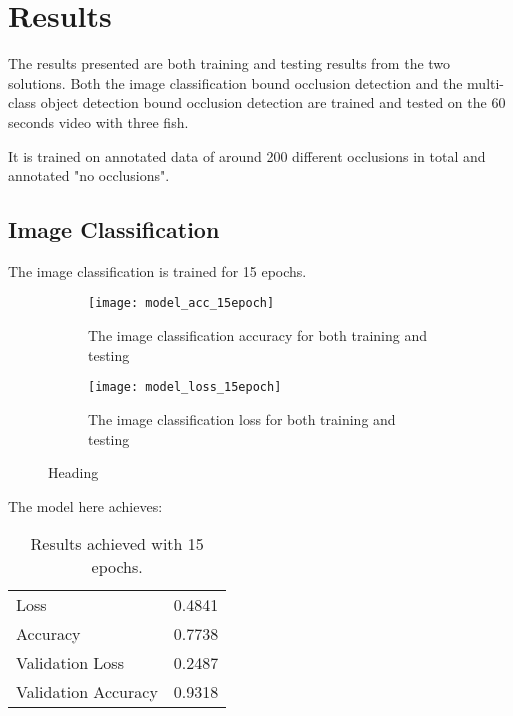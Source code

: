 \graphicspath{{figures/results/}}
\chapter{Results}
The results presented are both training and testing results from the two solutions. Both the image classification bound occlusion detection and the multi-class object detection bound occlusion detection are trained and tested on the 60 seconds video with three fish.

It is trained on annotated data of around 200 different occlusions in total and annotated "no occlusions".
%
\section{Image Classification}
The image classification is trained for 15 epochs.
\begin{figure}[H]
	\centering
	\begin{subfigure}{0.48\textwidth}
		\texttt{[image: model\_acc\_15epoch]}
		\caption{The image classification accuracy for both training and testing}
		\label{fig:img_acc-15}
	\end{subfigure}
	\begin{subfigure}{0.48\textwidth}
		\texttt{[image: model\_loss\_15epoch]}
		\caption{The image classification loss for both training and testing}
		\label{fig:img_loss-15}
	\end{subfigure}
\caption{Heading}
\label{fig:img_class-15ep}
\end{figure}
The model here achieves: 
\begin{table}[H]
	\centering
	\caption{Results achieved with 15 epochs.}
	\begin{tabular}{|l|l|}
		\hline
		Loss                & 0.4841 \\\rowcolor{lightGrey}\hline
		Accuracy            & 0.7738 \\ \hline
		Validation Loss     & 0.2487 \\\rowcolor{lightGrey}\hline
		Validation Accuracy & 0.9318\\ \hline
	\end{tabular}
\label{tab:img_class_15ep}
\end{table}

